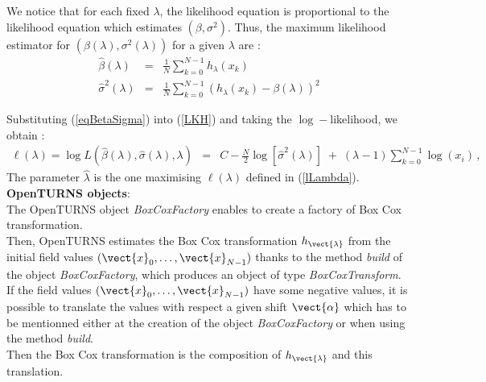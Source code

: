 We notice that for each fixed $\lambda$, the likelihood equation is proportional to the likelihood equation which estimates  $(\beta, \sigma^2)$.
Thus, the maximum likelihood estimator for $(\beta(\lambda), \sigma^2(\lambda))$ for a given $\lambda$  are :
\begin{eqnarray}\label{eqBetaSigma}
  \hat{\beta}(\lambda) & = & \frac{1}{N} \sum_{k=0}^{N-1} h_{\lambda}(x_k) \\
  \hat{\sigma}^2(\lambda)  & = &  \frac{1}{N} \sum_{k=0}^{N-1} (h_{\lambda}(x_k) - \beta(\lambda))^2
\end{eqnarray}

Substituting (\ref{eqBetaSigma}) into (\ref{LKH}) and taking the $\log-$likelihood, we obtain :
\begin{eqnarray}\label{lLambda}
  \ell(\lambda) = \log L( \hat{\beta}(\lambda), \hat{\sigma}(\lambda),\lambda ) & = & C -
  \frac{N}{2}
  \log\left[\hat{\sigma}^2(\lambda)\right]
  \;+\;
  \left(\lambda - 1 \right) \sum_{k=0}^{N-1} \log(x_i)\,,%
\end{eqnarray}
The parameter $\hat{\lambda}$ is the one maximising $\ell(\lambda)$ defined in (\ref{lLambda}).\\


{\bf OpenTURNS objects}:\\
The OpenTURNS object \emph{BoxCoxFactory} enables to create a factory of Box Cox transformation.\\

Then, OpenTURNS estimates the Box Cox transformation $h_{\vect{\lambda}}$ from  the initial field values $(\vect{x}_0, \dots, \vect{x}_{N-1})$ thanks to the method \emph{build} of the object \emph{BoxCoxFactory}, which produces an object of type \emph{BoxCoxTransform}. \\

If the field values  $(\vect{x}_0, \dots, \vect{x}_{N-1})$ have some negative values, it is possible to translate the values with respect a given shift $\vect{\alpha}$ which has to be mentionned either at the creation of the object {\itshape BoxCoxFactory} or when using the method \emph{build}.\\
Then the  Box Cox transformation is the composition of $h_{\vect{\lambda}}$  and this translation. \\


